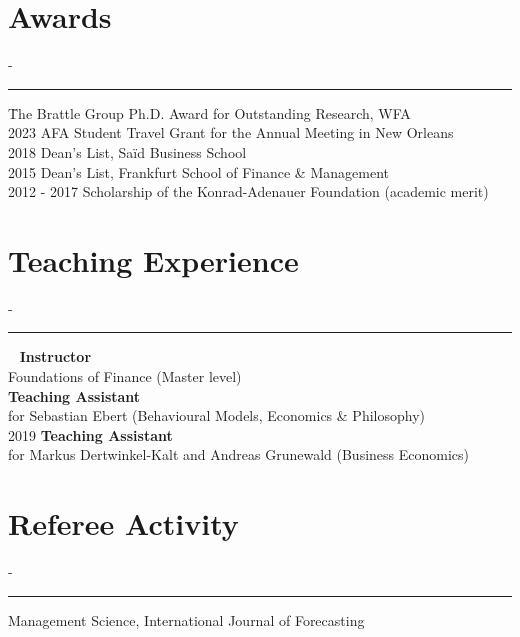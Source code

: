 \documentclass{res}
\newcommand{\sectionline}{	\vspace{-8pt}
	{\parindent-\sectionwidth \rule{\resumewidth}{0.4pt}} }
\newenvironment{nstabbing}
  {\setlength{\topsep}{-\parskip}%
   \setlength{\partopsep}{0pt}%
   \tabbing}
  {\endtabbing}
\begin{document}
\begin{resume}
\section{Awards} 	
	\sectionline
	\vspace{-3ex}
    \begin{nstabbing}
    2024 \qquad \qquad \qquad \= The Brattle Group Ph.D. Award for Outstanding Research, WFA \\[0.5ex]
    2023 \> AFA Student Travel Grant for the Annual Meeting in New Orleans \\[0.5ex]
    2018 \> Dean's List, Sa\"{i}d Business School \\[0.5ex]
    2015 \> Dean's List, Frankfurt School of Finance \& Management \\[0.5ex]
    2012 - 2017 \> Scholarship of the Konrad-Adenauer Foundation (academic merit)
    \end{nstabbing}

\section{Teaching Experience}
	\sectionline
	\vspace{-3ex}
    \begin{nstabbing}
    2020 ~ \qquad \quad \= \textbf{Instructor} \\
				\> Foundations of Finance (Master level)  \\[0.5ex]
    \> \textbf{Teaching Assistant}\\
					\> for Sebastian Ebert (Behavioural Models, Economics \& Philosophy) \\[0.5ex]
    2019 \> \textbf{Teaching Assistant} \\
				\> for Markus Dertwinkel-Kalt and Andreas Grunewald (Business Economics)  \\[0.5ex]
    \end{nstabbing}

\section{Referee Activity}
\sectionline
\vspace{-3ex}
\begin{nstabbing}
	Management Science, International Journal of Forecasting
\end{nstabbing}

	

\end{resume}
\end{document}
